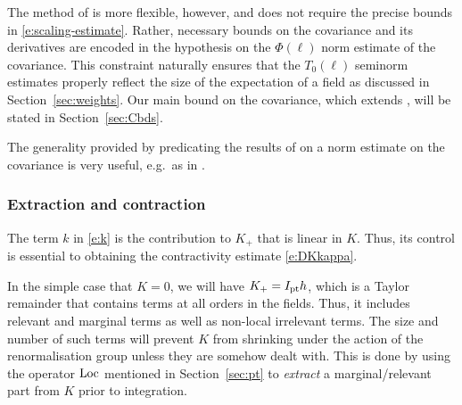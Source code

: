 The method of \cite{BS-rg-IE} is more flexible, however, and does not require
the precise bounds in \eqref{e:scaling-estimate}. Rather, necessary bounds on
the covariance and its derivatives are encoded in the hypothesis
\cite[\eqref{IE-e:CLbd}]{BS-rg-IE} on the $\Phi(\ell)$
norm estimate of the covariance. This constraint naturally ensures that the $T_0(\ell)$
seminorm estimates properly reflect the size of the expectation of a field as discussed
in Section~\ref{sec:weights}.
Our main bound on the covariance, which extends \cite[\eqref{IE-e:CLbd}]{BS-rg-IE},
will be stated in Section~\ref{sec:Cbds}.

\begin{rk}
The generality provided by predicating the results of \cite{BS-rg-IE} on a
norm estimate on the covariance is very useful, e.g.\ as in \cite{Slad17}.
\end{rk}

\subsubsection{Extraction and contraction}

The term $k$ in \eqref{e:k} is the contribution to $K_+$ that is linear in
$K$. Thus, its control is essential to obtaining the contractivity estimate
\eqref{e:DKkappa}.

In the simple case that $K = 0$, we will have $K_+ = I_{\rm pt} h$, which is a Taylor
remainder that contains terms at all orders in the fields. Thus, it includes
relevant and marginal terms as well as non-local irrelevant terms. The size and
number of such terms will prevent $K$ from shrinking under the action of the
renormalisation group unless they are somehow dealt with. This is done by using
the operator $\operatorname{Loc}$ mentioned in Section~\ref{sec:pt} to \emph{extract} a
marginal/relevant part from $K$ prior to integration.


